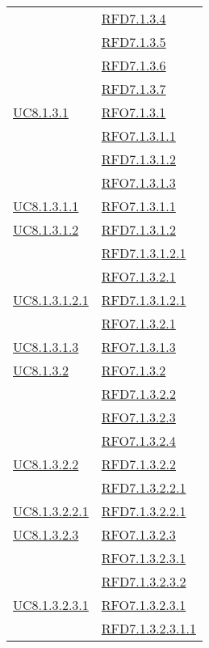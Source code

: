 \begin{longtable}{|>{\centering}m{5cm}|m{5cm}<{\centering}|}
& \hyperlink{RFD7.1.3.4}{RFD7.1.3.4}\\
& \hyperlink{RFD7.1.3.5}{RFD7.1.3.5}\\
& \hyperlink{RFD7.1.3.6}{RFD7.1.3.6}\\
& \hyperlink{RFD7.1.3.7}{RFD7.1.3.7}\\ \hline
\hyperref[UC8.1.3.1]{UC8.1.3.1} & \hyperlink{RFO7.1.3.1}{RFO7.1.3.1}\\
& \hyperlink{RFO7.1.3.1.1}{RFO7.1.3.1.1}\\
& \hyperlink{RFD7.1.3.1.2}{RFD7.1.3.1.2}\\
& \hyperlink{RFO7.1.3.1.3}{RFO7.1.3.1.3}\\ \hline
\hyperref[UC8.1.3.1.1]{UC8.1.3.1.1} & \hyperlink{RFO7.1.3.1.1}{RFO7.1.3.1.1}\\ \hline
\hyperref[UC8.1.3.1.2]{UC8.1.3.1.2} & \hyperlink{RFD7.1.3.1.2}{RFD7.1.3.1.2}\\
& \hyperlink{RFD7.1.3.1.2.1}{RFD7.1.3.1.2.1}\\
& \hyperlink{RFO7.1.3.2.1}{RFO7.1.3.2.1}\\ \hline
\hyperref[UC8.1.3.1.2.1]{UC8.1.3.1.2.1} & \hyperlink{RFD7.1.3.1.2.1}{RFD7.1.3.1.2.1}\\
& \hyperlink{RFO7.1.3.2.1}{RFO7.1.3.2.1}\\ \hline
\hyperref[UC8.1.3.1.3]{UC8.1.3.1.3} & \hyperlink{RFO7.1.3.1.3}{RFO7.1.3.1.3}\\ \hline
\hyperref[UC8.1.3.2]{UC8.1.3.2} & \hyperlink{RFO7.1.3.2}{RFO7.1.3.2}\\
& \hyperlink{RFD7.1.3.2.2}{RFD7.1.3.2.2}\\
& \hyperlink{RFO7.1.3.2.3}{RFO7.1.3.2.3}\\
& \hyperlink{RFO7.1.3.2.4}{RFO7.1.3.2.4}\\ \hline
\hyperref[UC8.1.3.2.2]{UC8.1.3.2.2} & \hyperlink{RFD7.1.3.2.2}{RFD7.1.3.2.2}\\
& \hyperlink{RFD7.1.3.2.2.1}{RFD7.1.3.2.2.1}\\ \hline
\hyperref[UC8.1.3.2.2.1]{UC8.1.3.2.2.1} & \hyperlink{RFD7.1.3.2.2.1}{RFD7.1.3.2.2.1}\\ \hline
\hyperref[UC8.1.3.2.3]{UC8.1.3.2.3} & \hyperlink{RFO7.1.3.2.3}{RFO7.1.3.2.3}\\
& \hyperlink{RFO7.1.3.2.3.1}{RFO7.1.3.2.3.1}\\
& \hyperlink{RFD7.1.3.2.3.2}{RFD7.1.3.2.3.2}\\ \hline
\hyperref[UC8.1.3.2.3.1]{UC8.1.3.2.3.1} & \hyperlink{RFO7.1.3.2.3.1}{RFO7.1.3.2.3.1}\\
& \hyperlink{RFD7.1.3.2.3.1.1}{RFD7.1.3.2.3.1.1}\\ \hline

\end{longtable}
